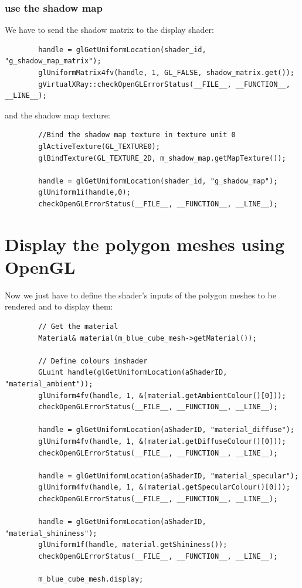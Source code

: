 \documentclass[12pt]{report}
\begin{document}
\subsection{use the shadow map}

We have to send the shadow matrix to the display shader:

\begin{lstlisting}
        handle = glGetUniformLocation(shader_id, "g_shadow_map_matrix");
        glUniformMatrix4fv(handle, 1, GL_FALSE, shadow_matrix.get());
        gVirtualXRay::checkOpenGLErrorStatus(__FILE__, __FUNCTION__, __LINE__);
\end{lstlisting}

and the shadow map texture:

\begin{lstlisting}
        //Bind the shadow map texture in texture unit 0
        glActiveTexture(GL_TEXTURE0);
        glBindTexture(GL_TEXTURE_2D, m_shadow_map.getMapTexture());

        handle = glGetUniformLocation(shader_id, "g_shadow_map");
        glUniform1i(handle,0);
        checkOpenGLErrorStatus(__FILE__, __FUNCTION__, __LINE__);
\end{lstlisting}

\chapter{Display the polygon meshes using OpenGL}

Now we just have to define the shader's inputs of the polygon meshes to be rendered and to display them:

\begin{lstlisting}
	    // Get the material
	    Material& material(m_blue_cube_mesh->getMaterial());

	    // Define colours inshader
	    GLuint handle(glGetUniformLocation(aShaderID, "material_ambient"));
	    glUniform4fv(handle, 1, &(material.getAmbientColour()[0]));
	    checkOpenGLErrorStatus(__FILE__, __FUNCTION__, __LINE__);

	    handle = glGetUniformLocation(aShaderID, "material_diffuse");
	    glUniform4fv(handle, 1, &(material.getDiffuseColour()[0]));
	    checkOpenGLErrorStatus(__FILE__, __FUNCTION__, __LINE__);

	    handle = glGetUniformLocation(aShaderID, "material_specular");
	    glUniform4fv(handle, 1, &(material.getSpecularColour()[0]));
	    checkOpenGLErrorStatus(__FILE__, __FUNCTION__, __LINE__);

	    handle = glGetUniformLocation(aShaderID, "material_shininess");
	    glUniform1f(handle, material.getShininess());
	    checkOpenGLErrorStatus(__FILE__, __FUNCTION__, __LINE__);
	    
	    m_blue_cube_mesh.display;
\end{lstlisting}
\end{document}
